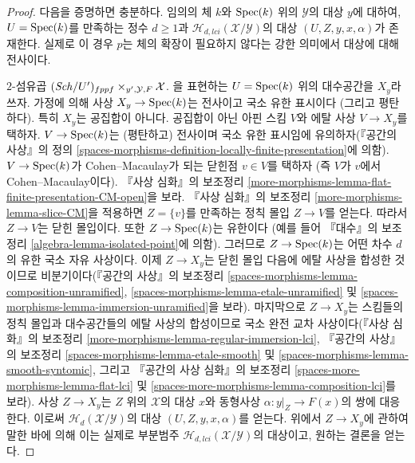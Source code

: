 \begin{proof}
다음을 증명하면 충분하다. 임의의 체 $k$와 $\mathop{\mathrm{Spec}}(k)$ 위의
$\mathcal{Y}$의 대상 $y$에 대하여, $U = \mathop{\mathrm{Spec}}(k)$를 만족하는 정수
$d \geq 1$과 $\mathcal{H}_{d, lci}(\mathcal{X}/\mathcal{Y})$의 대상
$(U, Z, y, x, \alpha)$가 존재한다. 실제로 이 경우 $p$는 체의 확장이
필요하지 않다는 강한 의미에서 대상에 대해 전사이다.

\medskip\noindent
$2$-섬유곱
$(\mathit{Sch}/U')_{fppf} \times_{y', \mathcal{Y}, F} \mathcal{X}$.
을 표현하는 $U = \mathop{\mathrm{Spec}}(k)$ 위의 대수공간을 $X_y$라 쓰자.
가정에 의해 사상 $X_y \to \mathop{\mathrm{Spec}}(k)$는 전사이고 국소 유한 표시이다
(그리고 평탄하다). 특히 $X_y$는 공집합이 아니다. 공집합이 아닌 아핀
스킴 $V$와 에탈 사상 $V \to X_y$를 택하자. $V \to \mathop{\mathrm{Spec}}(k)$는
(평탄하고) 전사이며 국소 유한 표시임에 유의하자(『공간의 사상』의
정의 \ref{spaces-morphisms-definition-locally-finite-presentation}에 의함).
$V \to \mathop{\mathrm{Spec}}(k)$가 Cohen--Macaulay가 되는 닫힌점 $v \in V$를 택하자
(즉 $V$가 $v$에서 Cohen--Macaulay이다). 『사상 심화』의 보조정리
\ref{more-morphisms-lemma-flat-finite-presentation-CM-open}을 보라.
『사상 심화』의 보조정리 \ref{more-morphisms-lemma-slice-CM}을 적용하면
$Z = \{v\}$를 만족하는 정칙 몰입 $Z \to V$를 얻는다. 따라서
$Z \to V$는 닫힌 몰입이다. 또한 $Z \to \mathop{\mathrm{Spec}}(k)$는 유한이다
(예를 들어 『대수』의 보조정리
\ref{algebra-lemma-isolated-point}에 의함). 그러므로
$Z \to \mathop{\mathrm{Spec}}(k)$는 어떤 차수 $d$의 유한 국소 자유 사상이다.
이제 $Z \to X_y$는 닫힌 몰입 다음에 에탈 사상을 합성한 것이므로
비분기이다(『공간의 사상』의 보조정리
\ref{spaces-morphisms-lemma-composition-unramified},
\ref{spaces-morphisms-lemma-etale-unramified} 및
\ref{spaces-morphisms-lemma-immersion-unramified}을 보라).
마지막으로 $Z \to X_y$는 스킴들의 정칙 몰입과 대수공간들의 에탈 사상의
합성이므로 국소 완전 교차 사상이다(『사상 심화』의 보조정리
\ref{more-morphisms-lemma-regular-immersion-lci}, 『공간의 사상』의 보조정리
\ref{spaces-morphisms-lemma-etale-smooth} 및
\ref{spaces-morphisms-lemma-smooth-syntomic}, 그리고 『공간의 사상 심화』의
보조정리 \ref{spaces-more-morphisms-lemma-flat-lci} 및
\ref{spaces-more-morphisms-lemma-composition-lci}를 보라).
사상 $Z \to X_y$는 $Z$ 위의 $\mathcal{X}$의 대상 $x$와 동형사상
$\alpha : y|_Z \to F(x)$의 쌍에 대응한다. 이로써
$\mathcal{H}_d(\mathcal{X}/\mathcal{Y})$의 대상
$(U, Z, y, x, \alpha)$를 얻는다. 위에서 $Z \to X_y$에 관하여 말한
바에 의해 이는 실제로 부분범주
$\mathcal{H}_{d, lci}(\mathcal{X}/\mathcal{Y})$의 대상이고, 원하는
결론을 얻는다.
\end{proof}




















